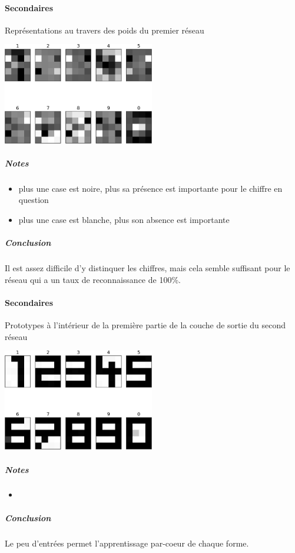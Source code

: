     \paragraph*{Secondaires}
      Représentations au travers des poids du premier réseau
      \begin{center}
	\includegraphics[width=250px]{data/expA1/representation.png}
      \end{center} 
      \subparagraph*{Notes}
	\begin{itemize}
	  \item plus une case est noire, plus sa présence est importante pour le chiffre en question
	  \item plus une case est blanche, plus son absence est importante
	\end{itemize}
      \subparagraph*{Conclusion}
	Il est assez difficile d'y distinquer les chiffres, mais cela semble suffisant pour le réseau
	qui a un taux de reconnaissance de 100\%.
    \paragraph*{Secondaires}
      Prototypes à l'intérieur de la première partie de la couche de sortie du second réseau
      \begin{center}
	\includegraphics[width=250px]{data/expA1/prototype.png}
      \end{center} 
      \subparagraph*{Notes}
	\begin{itemize}
	  \item 
	\end{itemize}
      \subparagraph*{Conclusion}
	Le peu d'entrées permet l'apprentissage par-coeur de chaque forme.
	


